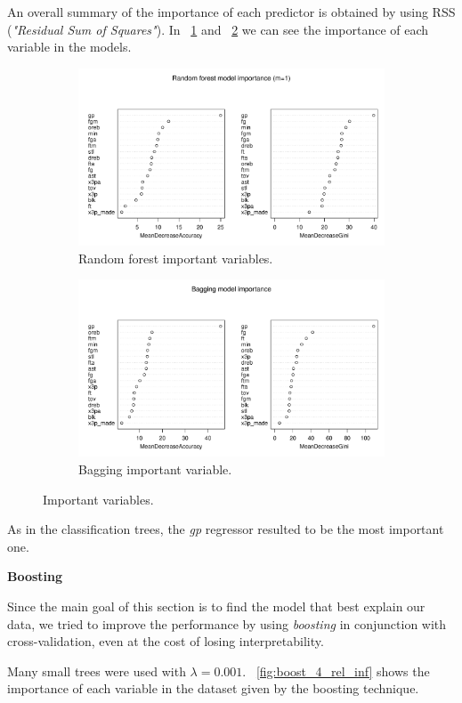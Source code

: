 An overall summary of the importance of each predictor is obtained by using RSS (\textit{"Residual Sum of Squares"}). In \Fig~\ref{fig:best_for_500_var_imp_plot} and \Fig~\ref{fig:bagg_500_var_imp_plot} we can see the importance of each variable in the models.

\begin{figure}[h]
	\centering
	\begin{subfigure}{.5\textwidth}
		\centering
		\includegraphics[width=0.5\linewidth]{ImageFiles/Classification/Trees/best_for_500_var_imp_plot}
		\caption{Random forest important variables.}
		\label{fig:best_for_500_var_imp_plot}
	\end{subfigure}%
	\hfill
	\begin{subfigure}{.5\textwidth}
		\centering
		\includegraphics[width=0.5\linewidth]{ImageFiles/Classification/Trees/bagg_500_var_imp_plot}
		\caption{Bagging important variable.}
		\label{fig:bagg_500_var_imp_plot}
	\end{subfigure}
	\caption{Important variables.}
	\label{fig:ImpVar}
\end{figure}

\noindent
As in the classification trees, the \textit{gp} regressor resulted to be the most important one.

\vspace{0.2cm}
\noindent
\textbf{Boosting}

Since the main goal of this section is to find the model that best explain our data, we tried to improve the performance by using \textit{boosting} in conjunction with cross-validation, even at the cost of losing interpretability. 

Many small trees were used with $\lambda = 0.001$. \Fig~\ref{fig:boost_4_rel_inf} shows the importance of each variable in the dataset given by the boosting technique.

